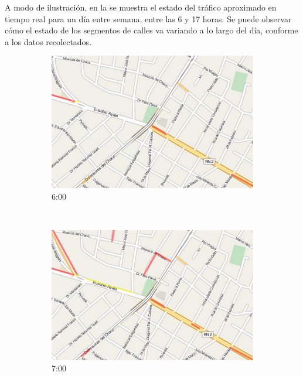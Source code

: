 A modo de ilustración, en la  se muestra el estado del tráfico aproximado en tiempo real para un día entre semana, entre las 6 y 17 horas. Se puede observar cómo el estado de los segmentos de calles va variando a lo largo del día, conforme a los datos recolectados.

\begin{figure}[!htbp]
	\centering
	\begin{subfigure}[b]{0.30\textwidth}
		\includegraphics[width=\textwidth]{capitulos/7/figuras/6.jpg}
		\caption{6:00}
	\end{subfigure}
	~~
	\begin{subfigure}[b]{0.30\textwidth}
		\includegraphics[width=\textwidth]{capitulos/7/figuras/7.jpg}
		\caption{7:00}		
	\end{subfigure}
	~~
	\begin{subfigure}[b]{0.30\textwidth}

\end{subfigure}
\end{figure}
